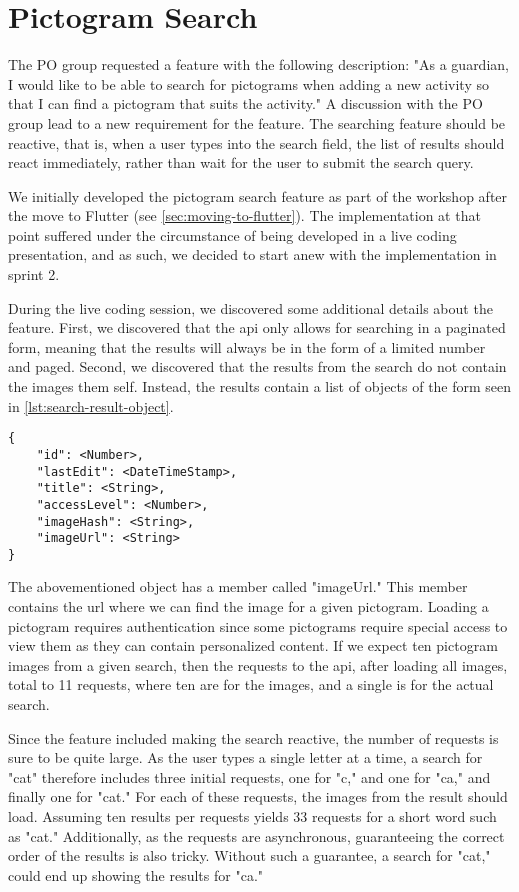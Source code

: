 \section{Pictogram Search}

The \gls{PO} group requested a feature with the following description: "As a guardian, I would like to be able to search for pictograms when adding a new activity so that I can find a pictogram that suits the activity." A discussion with the \gls{PO} group lead to a new requirement for the feature. The searching feature should be reactive, that is, when a user types into the search field, the list of results should react immediately, rather than wait for the user to submit the search query.

We initially developed the pictogram search feature as part of the workshop after the move to Flutter (see \autoref{sec:moving-to-flutter}). The implementation at that point suffered under the circumstance of being developed in a live coding presentation, and as such, we decided to start anew with the implementation in sprint 2.

During the live coding session, we discovered some additional details about the feature. First, we discovered that the \gls{api} only allows for searching in a paginated form, meaning that the results will always be in the form of a limited number and paged. Second, we discovered that the results from the search do not contain the images them self. Instead, the results contain a list of objects of the form seen in \autoref{lst:search-result-object}.

\begin{lstlisting}[label={lst:search-result-object},caption={Search result object}]
{
    "id": <Number>,
    "lastEdit": <DateTimeStamp>,
    "title": <String>,
    "accessLevel": <Number>,
    "imageHash": <String>,
    "imageUrl": <String>
}
\end{lstlisting}

The abovementioned object has a member called "imageUrl." This member contains the \gls{url} where we can find the image for a given pictogram. Loading a pictogram requires authentication since some pictograms require special access to view them as they can contain personalized content. If we expect ten pictogram images from a given search, then the requests to the \gls{api}, after loading all images, total to 11 requests, where ten are for the images, and a single is for the actual search.

Since the feature included making the search reactive, the number of requests is sure to be quite large. As the user types a single letter at a time, a search for "cat" therefore includes three initial requests, one for "c," and one for "ca," and finally one for "cat." For each of these requests, the images from the result should load. Assuming ten results per requests yields 33 requests for a short word such as "cat." Additionally, as the requests are asynchronous, guaranteeing the correct order of the results is also tricky. Without such a guarantee, a search for "cat," could end up showing the results for "ca."

